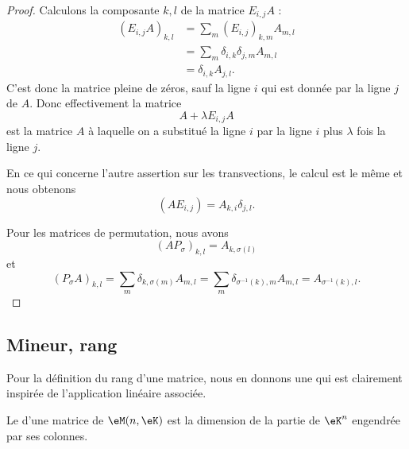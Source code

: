 \begin{proof}
	Calculons la composante \( k,l\) de la matrice \( E_{i,j}A\) :
	\begin{subequations}
		\begin{align}
			(E_{i,j}A)_{k,l} & =\sum_m(E_{i,j})_{k,m}A_{m,l}          \\
			                 & =\sum_m\delta_{i,k}\delta_{j,m}A_{m,l} \\
			                 & =\delta_{i,k}A_{j,l}.
		\end{align}
	\end{subequations}
	C'est donc la matrice pleine de zéros, sauf la ligne \( i\) qui est donnée par la ligne \( j\) de \( A\). Donc effectivement la matrice
	\begin{equation}
		A+\lambda E_{i,j}A
	\end{equation}
	est la matrice \( A\) à laquelle on a substitué la ligne \( i\) par la ligne \( i\) plus \( \lambda\) fois la ligne \( j\).

	En ce qui concerne l'autre assertion sur les transvections, le calcul est le même et nous obtenons
	\begin{equation}
		(AE_{i,j})=A_{k,i}\delta_{j,l}.
	\end{equation}

	Pour les matrices de permutation, nous avons
	\begin{equation}
		(AP_{\sigma})_{k,l}=A_{k,\sigma(l)}
	\end{equation}
	et
	\begin{equation}
		(P_{\sigma}A)_{k,l}=\sum_m\delta_{k,\sigma(m)}A_{m,l}=\sum_m\delta_{\sigma^{-1}(k),m}A_{m,l}=A_{\sigma^{-1}(k),l}.
	\end{equation}
\end{proof}

\subsection{Mineur, rang}

Pour la définition du rang d'une matrice, nous en donnons une qui est clairement inspirée de l'application linéaire associée.
\begin{definition}         \label{DEFooCSGXooFRzLRj}
	Le  d'une matrice de \( \eM(n,\eK)\) est la dimension de la partie de \( \eK^n\) engendrée par ses colonnes.
\end{definition}

